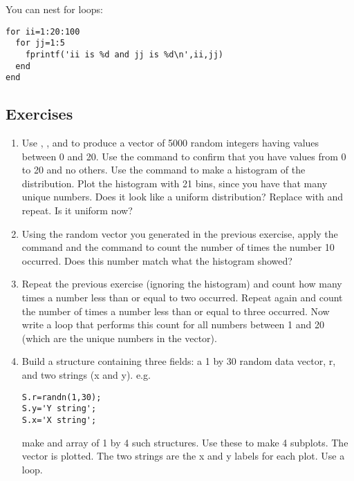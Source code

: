 \documentclass{article}
\begin{document}
You can nest for loops:
\begin{lstlisting}
for ii=1:20:100
  for jj=1:5
    fprintf('ii is %d and jj is %d\n',ii,jj)
  end
end
\end{lstlisting}



\subsection*{Exercises}
\begin{enumerate}

\item Use , , and \mcode{*} to produce a vector of 5000 random integers having values between 0 and 20. 
Use the  command to confirm that you have values from 0 to 20 and no others. Use the  command to make a histogram of the distribution. Plot the histogram with 21 bins, since you have that many unique numbers. Does it look like a uniform distribution? Replace  with  and repeat. Is it uniform now? 

\item Using the random vector you generated in the previous exercise, apply the  command and the  command to count the number of times the number 10 occurred. Does this number match what the histogram showed?

\item Repeat the previous exercise (ignoring the histogram) and count how many times a number less than or equal to two occurred. Repeat again and count the number of times a number less than or equal to three occurred. Now write a  loop that performs this count for all numbers between 1 and 20 (which are the unique numbers in the vector).

\item Build a structure containing three fields: a 1 by 30 random data vector, r, and two strings (x and y).  e.g.
\begin{lstlisting}
S.r=randn(1,30);
S.y='Y string';
S.x='X string';
\end{lstlisting}


make and array of 1 by 4 such structures. Use these to make 4 subplots. The vector is plotted. The two strings are the x and y labels for each plot. Use a loop.


\end{enumerate}
\end{document}
